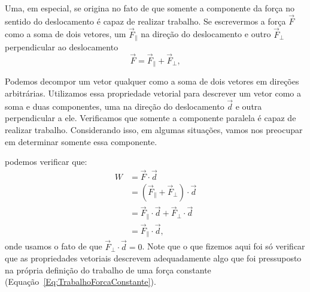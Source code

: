 Uma, em especial, se origina no fato de que somente a componente da força no sentido do deslocamento é capaz de realizar trabalho. Se escrevermos a força $\vec{F}$ como a soma de dois vetores, um $\vec{F}_{\parallel}$ na direção do deslocamento e outro $\vec{F}_{\perp}$ perpendicular ao deslocamento
\begin{equation}
    \vec{F} = \vec{F}_{\parallel} + \vec{F}_{\perp},
\end{equation}
%
\begin{marginfigure}
\centering
{}
\caption{Podemos decompor um vetor qualquer como a soma de dois vetores em direções arbitrárias. Utilizamos essa propriedade vetorial para descrever um vetor como a soma e duas componentes, uma na direção do deslocamento $\vec{d}$ e outra perpendicular a ele. Verificamos que somente a componente paralela é capaz de realizar trabalho. Considerando isso, em algumas situações, vamos nos preocupar em determinar somente essa componente.}
\end{marginfigure}
%
\noindent{}podemos verificar que:
\begin{align}
    W &= \vec{F}\cdot\vec{d} \\
    &= (\vec{F}_{\parallel} + \vec{F}_{\perp})\cdot\vec{d} \\
    &= \vec{F}_{\parallel} \cdot \vec{d} + \vec{F}_{\perp} \cdot \vec{d} \\
    &= \vec{F}_{\parallel} \cdot \vec{d},
\end{align}
%
onde usamos o fato de que $\vec{F}_{\perp} \cdot \vec{d} = 0$. Note que o que fizemos aqui foi só verificar que as propriedades vetoriais descrevem adequadamente algo que foi pressuposto na própria definição do trabalho de uma força constante (Equação~\ref{Eq:TrabalhoForcaConstante}).

